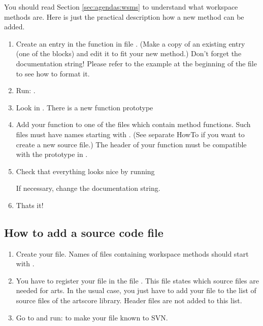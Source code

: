 You should read Section \ref{sec:agendas:wsms} to understand what workspace
methods are. Here is just the practical description how a new
method can be added.

\begin{enumerate}
\item Create an entry in the function  in file
  .  (Make a copy of an existing entry (one of the
   blocks) and edit it to fit your new
  method.) Don't forget the documentation string! Please refer to the
  example at the beginning of the file to see how to format it.
\item Run:
  .
\item Look in . There is a new function prototype
  \begin{quote}
  \end{quote}
\item Add your function to one of the  files which contain method
  functions. Such files must have names starting with . (See
  separate HowTo if you want to create a new source file.) The header
  of your function must be compatible with the prototype in .
\item Check that everything looks nice by running 
  \begin{quote}
  \end{quote}
  If necessary, change the documentation string.

\item Thats it!
\end{enumerate}


\subsection{How to add a source code file}
\begin{enumerate}
\item Create your file. Names of files containing workspace methods should
  start with .
\item You have to register your file in the file
  . This file states which source files
  are needed for arts. In the usual case, you just have to add your
   file to the list of source files of the artscore
  library. Header files are not added to this list.
\item Go to  and run:  to
  make your file known to SVN.
\end{enumerate}


